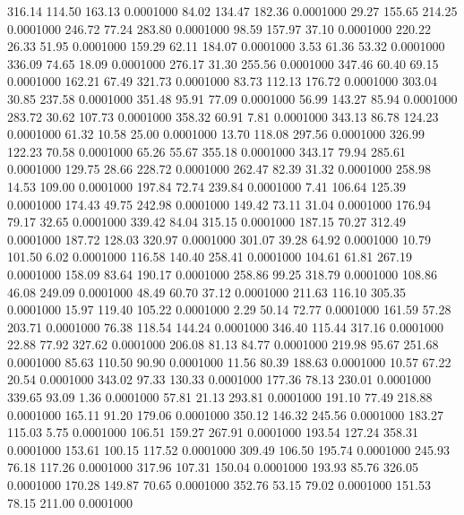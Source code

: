  316.14  114.50  163.13   0.0001000
  84.02  134.47  182.36   0.0001000
  29.27  155.65  214.25   0.0001000
 246.72   77.24  283.80   0.0001000
  98.59  157.97   37.10   0.0001000
 220.22   26.33   51.95   0.0001000
 159.29   62.11  184.07   0.0001000
   3.53   61.36   53.32   0.0001000
 336.09   74.65   18.09   0.0001000
 276.17   31.30  255.56   0.0001000
 347.46   60.40   69.15   0.0001000
 162.21   67.49  321.73   0.0001000
  83.73  112.13  176.72   0.0001000
 303.04   30.85  237.58   0.0001000
 351.48   95.91   77.09   0.0001000
  56.99  143.27   85.94   0.0001000
 283.72   30.62  107.73   0.0001000
 358.32   60.91    7.81   0.0001000
 343.13   86.78  124.23   0.0001000
  61.32   10.58   25.00   0.0001000
  13.70  118.08  297.56   0.0001000
 326.99  122.23   70.58   0.0001000
  65.26   55.67  355.18   0.0001000
 343.17   79.94  285.61   0.0001000
 129.75   28.66  228.72   0.0001000
 262.47   82.39   31.32   0.0001000
 258.98   14.53  109.00   0.0001000
 197.84   72.74  239.84   0.0001000
   7.41  106.64  125.39   0.0001000
 174.43   49.75  242.98   0.0001000
 149.42   73.11   31.04   0.0001000
 176.94   79.17   32.65   0.0001000
 339.42   84.04  315.15   0.0001000
 187.15   70.27  312.49   0.0001000
 187.72  128.03  320.97   0.0001000
 301.07   39.28   64.92   0.0001000
  10.79  101.50    6.02   0.0001000
 116.58  140.40  258.41   0.0001000
 104.61   61.81  267.19   0.0001000
 158.09   83.64  190.17   0.0001000
 258.86   99.25  318.79   0.0001000
 108.86   46.08  249.09   0.0001000
  48.49   60.70   37.12   0.0001000
 211.63  116.10  305.35   0.0001000
  15.97  119.40  105.22   0.0001000
   2.29   50.14   72.77   0.0001000
 161.59   57.28  203.71   0.0001000
  76.38  118.54  144.24   0.0001000
 346.40  115.44  317.16   0.0001000
  22.88   77.92  327.62   0.0001000
 206.08   81.13   84.77   0.0001000
 219.98   95.67  251.68   0.0001000
  85.63  110.50   90.90   0.0001000
  11.56   80.39  188.63   0.0001000
  10.57   67.22   20.54   0.0001000
 343.02   97.33  130.33   0.0001000
 177.36   78.13  230.01   0.0001000
 339.65   93.09    1.36   0.0001000
  57.81   21.13  293.81   0.0001000
 191.10   77.49  218.88   0.0001000
 165.11   91.20  179.06   0.0001000
 350.12  146.32  245.56   0.0001000
 183.27  115.03    5.75   0.0001000
 106.51  159.27  267.91   0.0001000
 193.54  127.24  358.31   0.0001000
 153.61  100.15  117.52   0.0001000
 309.49  106.50  195.74   0.0001000
 245.93   76.18  117.26   0.0001000
 317.96  107.31  150.04   0.0001000
 193.93   85.76  326.05   0.0001000
 170.28  149.87   70.65   0.0001000
 352.76   53.15   79.02   0.0001000
 151.53   78.15  211.00   0.0001000
